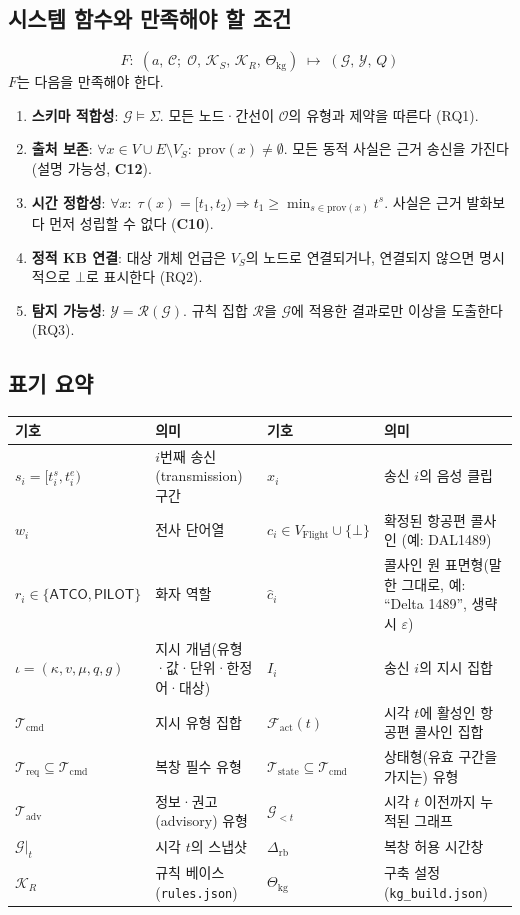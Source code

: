 \documentclass[10pt,a4paper]{article}
\newcommand{\G}{\mathcal{G}}
\newcommand{\KS}{\mathcal{K}_S}
\newcommand{\Ont}{\mathcal{O}}
\newcommand{\Ctx}{\mathcal{C}}
\newcommand{\Tcmd}{\mathcal{T}_{\mathrm{cmd}}}
\newcommand{\Treq}{\mathcal{T}_{\mathrm{req}}}
\newcommand{\Tst}{\mathcal{T}_{\mathrm{state}}}
\newcommand{\Tadv}{\mathcal{T}_{\mathrm{adv}}}
\newcommand{\Yset}{\mathcal{Y}}
\newcommand{\KR}{\mathcal{K}_R}
\newcommand{\Cfg}{\Theta_{\mathrm{kg}}}
\newcommand{\ATCO}{\textsf{ATCO}}
\newcommand{\PILOT}{\textsf{PILOT}}
\newcommand{\cmd}[1]{\textsf{\small #1}}
\newcommand{\ch}[1]{\textbf{\textcolor{red!60!black}{#1}}}
\begin{document}
\subsection{시스템 함수와 만족해야 할 조건}
\begin{equation}
F:\; (a,\, \Ctx;\; \Ont,\, \KS,\, \KR,\, \Cfg) \;\longmapsto\; (\G,\, \Yset,\, Q)
\end{equation}
$F$는 다음을 만족해야 한다.
\begin{enumerate}[label=(P\arabic*)]
\item \textbf{스키마 적합성}: $\G \models \Sigma$. 모든 노드·간선이 $\Ont$의 유형과 제약을 따른다 (RQ1).
\item \textbf{출처 보존}: $\forall x \in V\cup E \setminus V_S:\; \mathrm{prov}(x) \neq \emptyset$. 모든 동적 사실은 근거 송신을 가진다 (설명 가능성, \ch{C12}).
\item \textbf{시간 정합성}: $\forall x:\; \tau(x)=[t_1,t_2) \Rightarrow t_1 \ge \min_{s\in\mathrm{prov}(x)} t^{s}$. 사실은 근거 발화보다 먼저 성립할 수 없다 (\ch{C10}).
\item \textbf{정적 KB 연결}: 대상 개체 언급은 $V_S$의 노드로 연결되거나, 연결되지 않으면 명시적으로 $\bot$로 표시한다 (RQ2).
\item \textbf{탐지 가능성}: $\Yset = \mathcal{R}(\G)$. 규칙 집합 $\mathcal{R}$을 $\G$에 적용한 결과로만 이상을 도출한다 (RQ3).
\end{enumerate}

\subsection{표기 요약}
\begin{center}\small
\begin{tabular}{@{}ll@{\qquad}ll@{}}
\toprule
기호 & 의미 & 기호 & 의미\\\midrule
$s_i=[t^s_i,t^e_i)$ & $i$번째 송신(transmission) 구간 & $x_i$ & 송신 $i$의 음성 클립\\
$w_i$ & 전사 단어열 & $c_i\in V_{\mathrm{Flight}}\cup\{\bot\}$ & 확정된 항공편 콜사인 (예: \cmd{DAL1489})\\
$r_i\in\{\ATCO,\PILOT\}$ & 화자 역할 & $\hat c_i$ & 콜사인 원 표면형(말한 그대로, 예: ``Delta 1489'', 생략 시 $\varepsilon$)\\
$\iota=(\kappa,v,\mu,q,g)$ & 지시 개념(유형·값·단위·한정어·대상) & $I_i$ & 송신 $i$의 지시 집합\\
$\Tcmd$ & 지시 유형 집합 & $\mathcal{F}_{\mathrm{act}}(t)$ & 시각 $t$에 활성인 항공편 콜사인 집합\\
$\Treq\subseteq\Tcmd$ & 복창 필수 유형 & $\Tst\subseteq\Tcmd$ & 상태형(유효 구간을 가지는) 유형\\
$\Tadv$ & 정보·권고(advisory) 유형 & $\G_{<t}$ & 시각 $t$ 이전까지 누적된 그래프\\
$\G|_t$ & 시각 $t$의 스냅샷 & $\Delta_{\mathrm{rb}}$ & 복창 허용 시간창\\
$\KR$ & 규칙 베이스 (\texttt{rules.json}) & $\Cfg$ & 구축 설정 (\texttt{kg\_build.json})\\
\bottomrule
\end{tabular}
\end{center}
\end{document}
